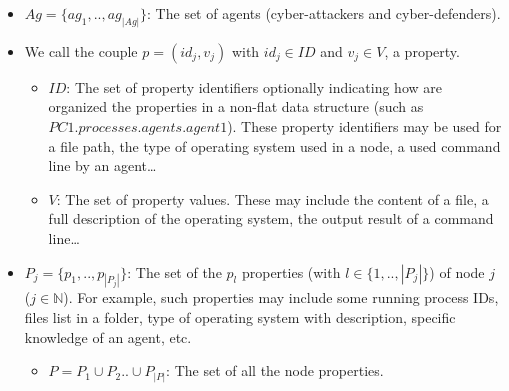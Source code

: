\documentclass[conference]{IEEEtran}
\begin{document}
\begin{itemize}

    \item $Ag = \{ag_1,..,ag_{|Ag|}\}$: The set of agents (cyber-attackers and cyber-defenders).

    \item We call the couple $p = (id_{j}, v_{j})$ with $id_j \in {ID}$ and $v_j \in V$, a property.
          \begin{itemize}
              \item $ID$: The set of property identifiers optionally indicating how are organized the properties in a non-flat data structure (such as $PC1.processes.agents.agent1$). These property identifiers may be used for a file path, the type of operating system used in a node, a used command line by an agent\dots
              \item $V$: The set of property values. These may include the content of a file, a full description of the operating system, the output result of a command line\dots
          \end{itemize}

    \item $P_{j} = \{ p_1, .., p_{|P_{j}|} \}$: The set of the $p_{l}$ properties (with $l \in \{1,..,|P_{j}|\}$) of node $j$ ($j \in \mathbb{N} $). For example, such properties may include some running process IDs, files list in a folder, type of operating system with description, specific knowledge of an agent, etc.
          \begin{itemize}
              \item $P = P_1 \cup P_2 .. \cup P_{|P|} $: The set of all the node properties.
          \end{itemize}


\end{itemize}
\end{document}
